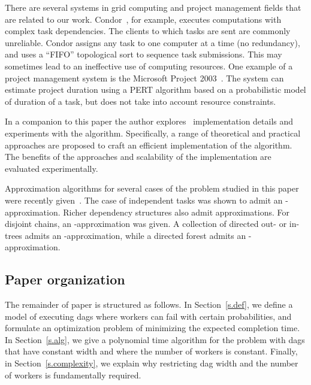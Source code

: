 \documentclass[letterpaper,11pt]{article}
\newcommand{\remove}[1]{}
\begin{document}
\remove{
Pebble Games have been used to model scheduling problems on dags~\cite{PatersonH70,Cook74,HopcroftPV77,HongK81,RosenbergS83}. In this model we are given a supply of pebbles and certain rules that restrict how pebbles can be placed on the dag's nodes. The goal is to determine how to place the pebbles on the nodes (i.e., how to ``play the game'') to meet a certain performance goal. 
}

There are several systems in grid computing and project management fields that are related to our work. Condor~\cite{TTL05}, for example, executes computations with complex task dependencies. The clients to which tasks are sent are commonly unreliable. Condor assigns any task to one computer at a time (no redundancy), and uses a
``FIFO'' topological sort to sequence task submissions. This may sometimes lead to an ineffective use of computing resources.
One example of a project management system is the Microsoft Project 2003~\cite{MsftProj03}. The system can estimate project duration using a PERT algorithm based on a probabilistic model of duration of a task, but does not take into account resource constraints.

In a companion to this paper the author explores~\cite{Mal05b} implementation details and experiments with the algorithm. Specifically, a range of theoretical and practical approaches are proposed to craft an efficient implementation of the algorithm. The benefits of the approaches and scalability of the implementation are evaluated experimentally.

Approximation algorithms for several cases of the problem studied in this paper were recently given~\cite{LR07,L07}. The case of independent tasks was shown to admit an -approximation. Richer dependency structures also admit approximations. For disjoint chains, an
-approximation was given. A collection of directed out- or in-trees admits an -approximation, while a directed forest admits an -approximation.

\subsection{Paper organization}
The remainder of paper is structured as follows. In Section~\ref{s.def}, we define a model of executing dags where workers can fail with certain probabilities, and formulate an optimization problem of minimizing the expected completion time. In Section~\ref{s.alg}, we give a polynomial time algorithm for the problem with dags that have constant width and where the number of workers is constant. Finally, in Section~\ref{s.complexity}, we explain why restricting dag width and the number of workers is fundamentally required.
\end{document}
